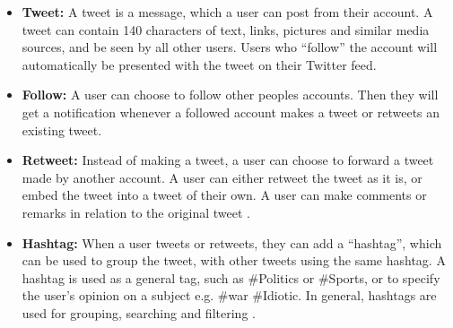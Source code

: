 \begin{itemize}
  \item \textbf{Tweet:} A tweet is a message, which a user can post from their
  account. A tweet can contain 140 characters \citep{StartingTwitter2}
   of text, links, pictures and
  similar media sources, and be seen by all other users. Users who ``follow''
  the account will automatically be presented with the tweet on their Twitter
  feed.
  \item \textbf{Follow:} A user can choose to follow other peoples accounts.
  Then they will get a notification whenever a followed account makes a tweet
  or retweets an existing tweet.
  \item \textbf{Retweet:} Instead of making a tweet, a user can choose to
  forward a tweet made by another account. A user can either retweet the tweet
  as it is, or embed the tweet into a tweet of their own. A user can make
  comments or remarks in relation to the original tweet .
  \item \textbf{Hashtag:} When a user tweets or retweets, they can add a
  ``hashtag'', which can be used to group the tweet, with other tweets using
  the same hashtag. A hashtag is used as a general tag, such as \#Politics or
  \#Sports, or to specify the user's opinion on a subject e.g. \#war \#Idiotic.
  In general, hashtags are used for grouping, searching and filtering 
  .
\end{itemize}

